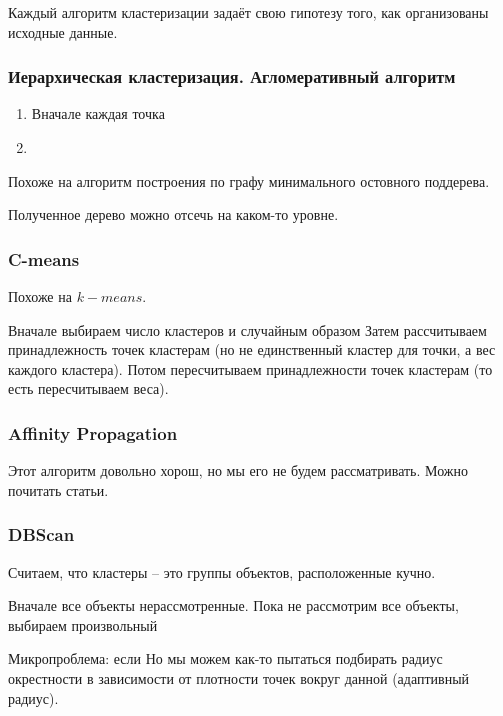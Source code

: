 \documentclass[main.tex]{subfiles}
\begin{document}
Каждый алгоритм кластеризации задаёт свою гипотезу того, как организованы исходные данные.

\subsubsection{ Иерархическая кластеризация. Агломеративный алгоритм }

\begin{enumerate}[noitemsep]
	\item Вначале каждая точка
	\item %
\end{enumerate}

Похоже на алгоритм построения по графу минимального остовного поддерева.

Полученное дерево можно отсечь на каком-то уровне.

\subsubsection{C-means}

Похоже на $k-means$.

Вначале выбираем число кластеров и случайным образом 
Затем рассчитываем принадлежность точек кластерам (но не единственный кластер для точки, а вес каждого кластера).
Потом пересчитываем принадлежности точек кластерам (то есть пересчитываем веса).

\subsubsection{ Affinity Propagation }

Этот алгоритм довольно хорош, но мы его не будем рассматривать.
Можно почитать статьи.

\subsubsection{DBScan}

Считаем, что кластеры -- это группы объектов, расположенные кучно.



Вначале все объекты нерассмотренные.
Пока не рассмотрим все объекты, выбираем произвольный 

Микропроблема: если
Но мы можем как-то пытаться подбирать радиус окрестности в зависимости от плотности точек вокруг данной (адаптивный радиус).

\subsubsection{} %
\end{document}

